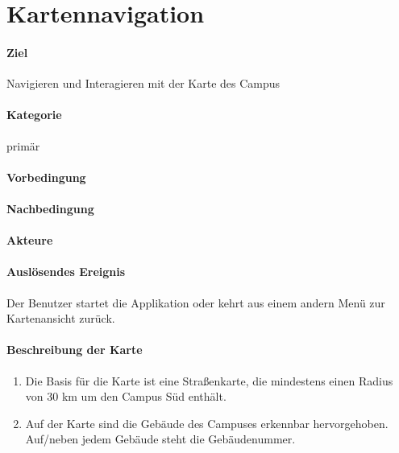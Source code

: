 \section{Kartennavigation}
\paragraph{Ziel}
Navigieren und Interagieren mit der Karte des Campus
\paragraph{Kategorie}
primär
\paragraph{Vorbedingung}

\paragraph{Nachbedingung}

\paragraph{Akteure}

\paragraph{Auslösendes Ereignis}
Der Benutzer startet die Applikation oder kehrt aus einem andern Menü zur Kartenansicht zurück.
\paragraph{Beschreibung der Karte}
\begin{enumerate}
    \item Die Basis für die Karte ist eine Straßenkarte, die mindestens einen Radius von 30 km um den Campus Süd enthält.
    \item Auf der Karte sind die Gebäude des Campuses erkennbar hervorgehoben. Auf/neben jedem Gebäude steht die Gebäudenummer.
\end{enumerate}
